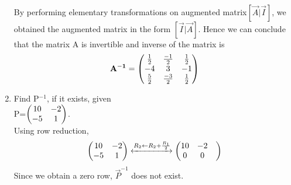 \documentclass[journal,12pt,twocolumn]{IEEEtran}
\renewcommand\thesection{\arabic{section}}
\begin{document}
\begin{enumerate}[label=\thesection.\arabic*.,ref=\thesection.\theenumi]
\begin{align}
    \end{align}
    By performing elementary transformations on augmented matrix$ [\vec{A} | \vec{I}]$, we obtained the augmented matrix in the form $ [\vec{I} | \vec{A}]$. 
    Hence we can conclude that the matrix A is invertible and inverse of the matrix is
    \begin{align}
\mathbf{A^{-1}}=\begin{pmatrix}  \frac{1}{2} & \frac{-1}{2} & \frac{1}{2} \\  -4 & 3 & -1\\ \frac{5}{2} &\frac{-3}{2} &\frac{1}{2}\end{pmatrix}
    \end{align}
    \item Find P$^{-1}$, if it exists, given \\
    P=$\begin{pmatrix} 10 &-2\\-5 &1\end{pmatrix}$.\\
    \solution
Using row reduction, 
%
\begin{align}
\begin{pmatrix} 10 & -2 \\-5 & 1\end{pmatrix}
\xleftrightarrow {R_2 \leftarrow R_2+\frac{R_1}{2}}\begin{pmatrix} 10& -2& \\0 & 0\end{pmatrix}
\end{align} 
Since we obtain a zero row, 
$\vec {P}^{-1} $ does not exist.
%    
 
\end{enumerate}
 
\end{document}
